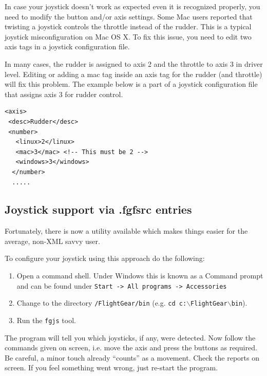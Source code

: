 {In case your joystick doesn't work as expected even it is recognized properly, you need to modify the button and/or axis settings. Some Mac users reported that twisting a joystick controls the throttle instead of the rudder. This is a typical joystick misconfiguration on Mac OS X. To fix this issue, you need to edit two axis tags in a joystick configuration file. 

In many cases, the rudder is assigned to axis 2 and the throttle to axis 3 in driver level. Editing or adding a mac tag inside an axis tag for the rudder (and throttle) will fix this problem. The example below is a part of a joystick configuration file that assigns axis 3 for rudder control. 

\begin{verbatim}
<axis>
 <desc>Rudder</desc>
 <number>
   <linux>2</linux>
   <mac>3</mac> <!-- This must be 2 -->
   <windows>3</windows>
  </number>
  .....
\end{verbatim}

\subsection{Joystick support via .fgfsrc entries\label{fgfsrcjoy}}
Fortunately, there is now a utility available which makes things easier for the average, non-XML savvy user.

To configure your joystick using this approach do the following:

\begin{enumerate}
\item Open a command shell. Under Windows this is known as a Command prompt and can be found under \texttt{Start -> All programs -> Accessories}
\item Change to the directory \texttt{/FlightGear/bin} (e.g. \texttt{cd c:$\backslash$FlightGear$\backslash$bin}).
\item Run the \texttt{fgjs} tool.
\end{enumerate}

The program will tell you which joysticks, if any, were detected. Now follow the
commands given on screen, i.e. move the axis and press the buttons as required.
Be careful, a minor touch already ``counts'' as a movement. Check the reports
on screen. If you feel something went wrong, just re-start the program.

}
